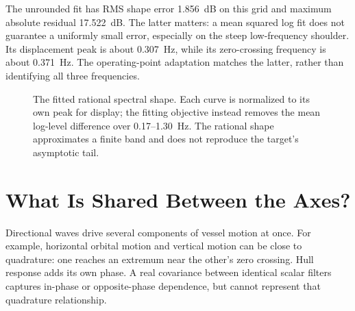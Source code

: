 \documentclass[conference]{IEEEtran}
\begin{document}
The unrounded fit has RMS shape error 1.856~dB on this grid and maximum
absolute residual 17.522~dB. The latter matters: a mean squared log fit
does not guarantee a uniformly small error, especially on the steep
low-frequency shoulder. Its displacement peak is about 0.307~Hz, while its
zero-crossing frequency is about 0.371~Hz. The operating-point adaptation
matches the latter, rather than identifying all three frequencies.

\begin{figure}[!t]\centering
{}
\caption{The fitted rational spectral shape. Each curve is normalized to
its own peak for display; the fitting objective instead removes the mean
log-level difference over 0.17--1.30~Hz. The rational shape approximates a
finite band and does not reproduce the target's asymptotic tail.}
\label{fig:fit}
\end{figure}

\section{What Is Shared Between the Axes?}
\label{sec:shared}
Directional waves drive several components of vessel motion at once.
For example, horizontal orbital motion and vertical motion can be close
to quadrature: one reaches an extremum near the other's zero crossing.
Hull response adds its own phase. A real covariance between identical
scalar filters captures in-phase or opposite-phase dependence, but cannot
represent that quadrature relationship.
\end{document}
